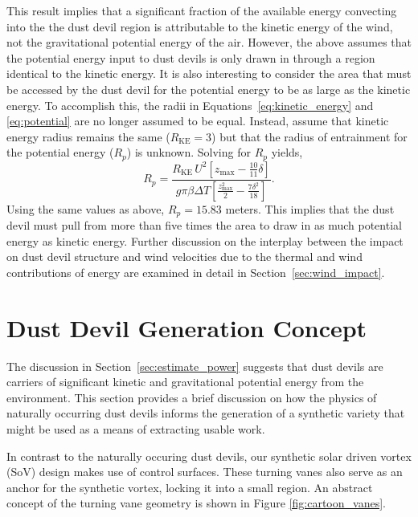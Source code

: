 This result implies that a significant fraction of the available energy 
convecting into the the dust devil region is attributable to 
the kinetic energy of the wind, not the
gravitational potential energy of the air.
However, the above assumes that the potential energy input to dust 
devils is only drawn in through a region identical to the kinetic energy. 
It is also interesting to 
consider the area that must be accessed by the dust devil for the 
potential energy to be as large as the kinetic energy. To accomplish this,
the radii in Equations~\ref{eq:kinetic_energy} 
and \ref{eq:potential} are no longer 
assumed to be equal. Instead, assume that 
kinetic energy radius remains the same ($R_{\text{KE}} = 3$) but that 
the radius of entrainment for the potential energy ($R_{p}$) is unknown.
Solving for $R_p$ yields, 
\begin{equation}
  R_p = \frac{R_{\text{KE}} \, U^2 \left[ z_{\text{max}} - \frac{10}{11}\delta
\right]}{g  \pi \beta \Delta T \left[ \frac{z_\text{max}^2}{2} - \frac{7 \delta^2}{18} \right]}.
\end{equation}
Using the same values as above, $R_p = 15.83$ meters. 
This implies that the dust devil must pull from more than five times the area to
draw in as much potential energy as kinetic energy. 
Further discussion on the interplay
between the impact on dust devil structure and wind velocities due to
the thermal and wind contributions of energy are examined in detail in
Section~\ref{sec:wind_impact}. 


\section{Dust Devil Generation Concept}
\label{sec:dust_devil_concept}

The discussion in Section~\ref{sec:estimate_power} suggests that dust devils are
carriers of significant kinetic and gravitational
potential energy from the environment. This section provides a brief
discussion on how the physics of naturally occurring dust devils informs
the generation of a synthetic variety that might be used as a means of
extracting usable work.    

In contrast to the naturally occuring dust devils,
our synthetic solar driven vortex (SoV) design makes use of
control surfaces. These turning vanes also serve as an anchor for the
synthetic vortex, locking it into a small region. An abstract concept of
the turning vane geometry is shown in Figure \ref{fig:cartoon_vanes}.

